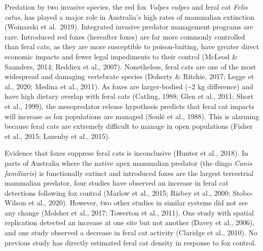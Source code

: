 \documentclass[]{elsarticle} %
\begin{document}
Predation by two invasive species, the red fox \emph{Vulpes vulpes} and feral cat \emph{Felis catus}, has played a major role in Australia's high rates of mammalian extinction (Woinarski et al.~2019).
Integrated invasive predator management programs are rare.
Introduced red foxes (hereafter foxes) are far more commonly controlled than feral cats, as they are more susceptible to poison-baiting, have greater direct economic impacts and fewer legal impediments to their control (McLeod \& Saunders, 2014; Reddiex et al., 2007).
Nonetheless, feral cats are one of the most widespread and damaging vertebrate species (Doherty \& Ritchie, 2017; Legge et al., 2020; Medina et al., 2011).
As foxes are larger-bodied (\textasciitilde2 kg difference) and have high dietary overlap with feral cats (Catling, 1988; Glen et al., 2011; Short et al., 1999), the mesopredator release hypothesis predicts that feral cat impacts will increase as fox populations are managed (Soulé et al., 1988).
This is alarming because feral cats are extremely difficult to manage in open populations (Fisher et al., 2015; Lazenby et al., 2015).

Evidence that foxes suppress feral cats is inconclusive (Hunter et al., 2018).
In parts of Australia where the native apex mammalian predator (the dingo \emph{Canis familiaris}) is functionally extinct and introduced foxes are the largest terrestrial mammalian predator, four studies have observed an increase in feral cat detections following fox control (Marlow et al., 2015; Risbey et al., 2000; Stobo-Wilson et al., 2020).
However, two other studies in similar systems did not see any change (Molsher et al., 2017; Towerton et al., 2011).
One study with spatial replication detected an increase at one site but not another (Davey et al., 2006), and one study observed a decrease in feral cat activity (Claridge et al., 2010).
No previous study has directly estimated feral cat density in response to fox control.
\end{document}
